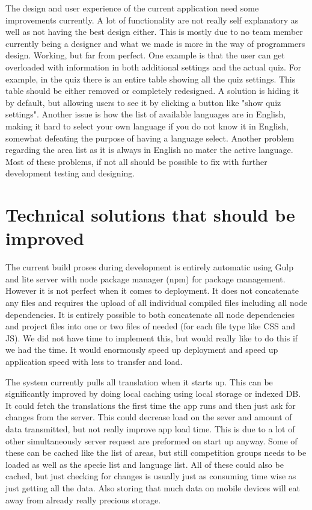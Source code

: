 The design and user experience of the current application need some improvements currently. A lot of functionality are not really self explanatory as well as not having the best design either. This is mostly due to no team member currently being a designer and what we made is more in the way of programmers design. Working, but far from perfect. One example is that the user can get overloaded with information in both additional settings and the actual quiz. For example, in the quiz there is an entire table showing all the quiz settings. This table should be either removed or completely redesigned. A solution is hiding it by default, but allowing users to see it by clicking a button like "show quiz settings". Another issue is how the list of available languages are in English, making it hard to select your own language if you do not know it in English, somewhat defeating the purpose of having a language select. Another problem regarding the area list as it is always in English no mater the active language. Most of these problems, if not all  should be possible to fix with further development testing and designing. 


\section{Technical solutions that should be improved}

The current build proses during development is entirely automatic using Gulp and lite server with node package manager (npm) for package management. However it is not perfect when it comes to deployment. It does not concatenate any files and requires the upload of all individual compiled files including all node dependencies. It is entirely possible to both concatenate all node dependencies and project files into one or two files of needed (for each file type like CSS and JS). We did not have time to implement this, but would really like to do this if we had the time. It would enormously speed up deployment and speed up application speed with less to transfer and load.

The system currently pulls all translation when it starts up. This can be significantly improved by doing local caching using local storage or indexed DB. It could fetch the translations the first time the app runs and then just ask for changes from the server. This could decrease load on the sever and amount of data transmitted, but not really improve app load time. This is due to a lot of other simultaneously server request are preformed on start up anyway. Some of these can be cached like the list of areas, but still competition groups needs to be loaded as well as the specie list and language list. All of these could also be cached, but just checking for changes is usually just as consuming time wise as just getting all the data. Also storing that much data on mobile devices will eat away from already really precious storage.

